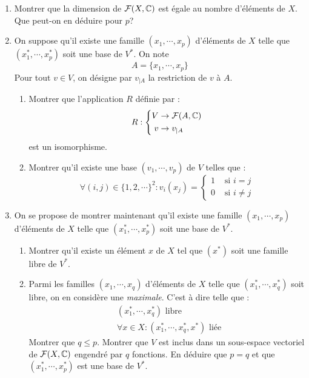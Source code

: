 \begin{enumerate}
 \item Montrer que la dimension de $\mathcal F (X,\mathbb{C})$ est égale au nombre d'éléments de $X$. Que peut-on en déduire pour $p$?
\item On suppose qu'il existe une famille $(x_1,\cdots, x_p)$ d'éléments de $X$ telle que $(x^*_1,\cdots, x^*_p)$ soit une base de $V^*$. On note
\begin{displaymath}
 A = \{x_1,\cdots,x_p\}
\end{displaymath}
Pour tout $v\in V$, on désigne par $v_{|A}$ la restriction de $v$ à $A$.
\begin{enumerate}
\item Montrer que l'application $R$ définie par :
\begin{displaymath}
 R :\left\lbrace 
\begin{aligned}
 V &\rightarrow \mathcal F(A,\mathbb{C}) \\
 v &\rightarrow v_{|A}
\end{aligned}
\right. 
\end{displaymath}
est un isomorphisme.
\item Montrer qu'il existe une base $(v_1,\cdots,v_p)$ de $V$ telles que :
\begin{displaymath}
 \forall (i,j)\in\{1,2,\cdots \}^2 : v_i(x_j)=
\left\lbrace 
\begin{aligned}
 1 &\text{ si } i=j \\
 0 &\text{ si } i\neq j
\end{aligned}
\right. 
\end{displaymath}
\end{enumerate}
\item On se propose de montrer maintenant qu'il existe une famille  $(x_1,\cdots, x_p)$ d'éléments de $X$ telle que $(x^*_1,\cdots, x^*_p)$ soit une base de $V^*$.
\begin{enumerate}
\item Montrer qu'il existe un élément $x$ de $X$ tel que $(x^*)$ soit une famille libre de $V^*$.
\item Parmi les familles $(x_1,\cdots, x_q)$ d'éléments de $X$ telle que $(x^*_1,\cdots, x^*_q)$ soit libre, on en considère une \emph{maximale}. C'est à dire telle que :
\begin{align*}
 &(x^*_1,\cdots, x^*_q) \text{ libre }\\
 &\forall x\in X : (x^*_1,\cdots, x^*_q,x^*) \text{ liée }
\end{align*}
Montrer que $q\leq p$. Montrer que $V$ est inclus dans un sous-espace vectoriel de $\mathcal F (X,\mathbb{C})$ engendré par $q$ fonctions. En déduire que $p=q$ et que $(x^*_1,\cdots, x^*_p)$ est une base de $V^*$.
\end{enumerate}
\end{enumerate}